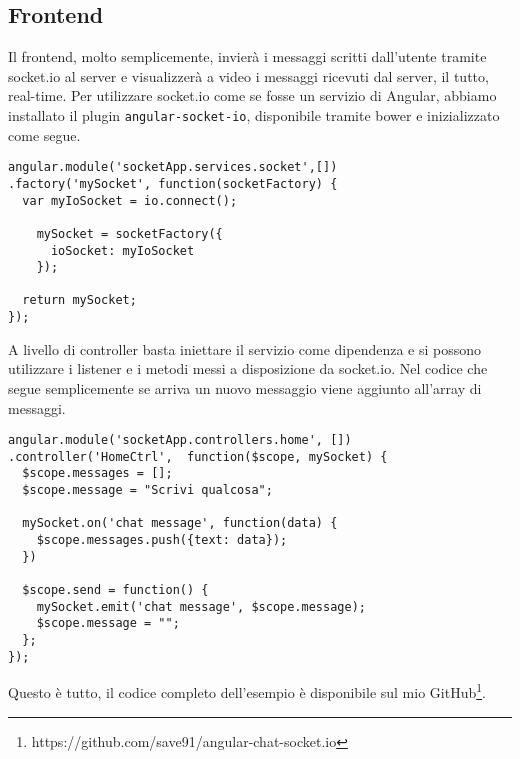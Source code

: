 \subsection{Frontend}
Il frontend, molto semplicemente, invierà i messaggi scritti dall'utente tramite socket.io al server e visualizzerà a video i messaggi ricevuti dal server, il tutto, real-time.
Per utilizzare socket.io come se fosse un servizio di Angular, 
abbiamo installato il plugin \texttt{angular-socket-io}, disponibile tramite bower e inizializzato come segue.
\begin{lstlisting}[caption={service mySocket}, style=javaScriptCode]
angular.module('socketApp.services.socket',[])
.factory('mySocket', function(socketFactory) {
  var myIoSocket = io.connect();

    mySocket = socketFactory({
      ioSocket: myIoSocket
    });

  return mySocket;
});
\end{lstlisting} 
A livello di controller basta iniettare il servizio come dipendenza e si
possono utilizzare i listener e i metodi messi a disposizione da socket.io.
Nel codice che segue semplicemente se arriva un nuovo messaggio viene aggiunto all'array di messaggi.
\begin{lstlisting}[caption={controller mySocket}, style=javaScriptCode]
angular.module('socketApp.controllers.home', [])
.controller('HomeCtrl',  function($scope, mySocket) {
  $scope.messages = [];
  $scope.message = "Scrivi qualcosa";

  mySocket.on('chat message', function(data) {
    $scope.messages.push({text: data});
  })

  $scope.send = function() {
    mySocket.emit('chat message', $scope.message);
    $scope.message = "";
  };
});
\end{lstlisting} 
Questo è tutto, il codice completo dell'esempio è disponibile sul mio GitHub\footnote{https://github.com/save91/angular-chat-socket.io}.



